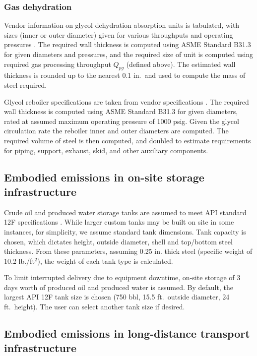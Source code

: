 \documentclass[11pt]{report}
\begin{document}
\subsubsection{Gas dehydration}

Vendor information on glycol dehydration absorption units is tabulated, with sizes (inner or outer diameter) given for various throughputs and operating pressures \cite{Exterran2012}. The required wall thickness is computed using ASME Standard B31.3 \cite[eq. 9.27]{Arnold2007} for given diameters and pressures, and the required  size of unit is computed using required gas processing throughput $Q_{pg}$ (defined above). The estimated wall thickness is rounded up to the nearest 0.1 in.\ and used to compute the mass of steel required. 

Glycol reboiler specifications are  taken from vendor specifications \cite{Exterran2012}. The required wall thickness is computed using ASME Standard B31.3 \cite[eq. 9.27]{Arnold2007} for given diameters, rated at assumed maximum operating pressure of 1000 psig. Given the glycol circulation rate  the reboiler inner and outer diameters are computed. The required volume of steel is then computed, and doubled to estimate requirements for piping, support, exhaust, skid, and other auxiliary components.

\subsection{Embodied emissions in on-site storage infrastructure}

Crude oil and produced water storage tanks are assumed to meet API standard 12F specifications \cite{API1994}. While larger custom tanks may be built on site in some instances, for simplicity, we assume standard tank dimensions. Tank capacity is chosen, which dictates height, outside diameter, shell and top/bottom steel thickness. From these parameters, assuming 0.25 in. thick steel (specific weight of 10.2 lb./ft$^2$), the weight of each tank type is calculated.

To  limit interrupted delivery due to equipment downtime, on-site storage of 3 days worth of produced oil and produced water is assumed. By default, the largest API 12F tank size is chosen (750 bbl, 15.5 ft.\ outside diameter, 24 ft.\ height). The user can select another tank size if desired.

\subsection{Embodied emissions in long-distance transport infrastructure}
\end{document}
